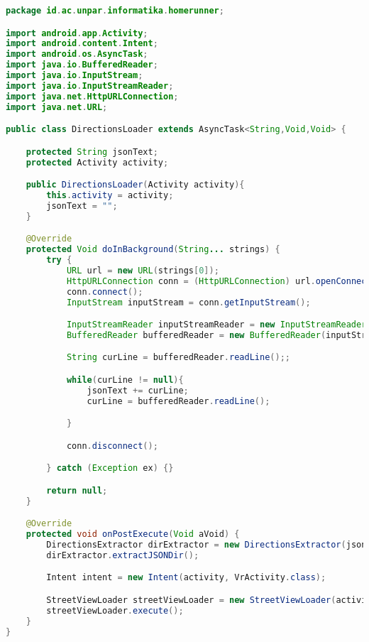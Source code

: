 \begin{lstlisting}[language=Java,caption=DirectionsLoader.java]
package id.ac.unpar.informatika.homerunner;

import android.app.Activity;
import android.content.Intent;
import android.os.AsyncTask;
import java.io.BufferedReader;
import java.io.InputStream;
import java.io.InputStreamReader;
import java.net.HttpURLConnection;
import java.net.URL;

public class DirectionsLoader extends AsyncTask<String,Void,Void> {

    protected String jsonText;
    protected Activity activity;

    public DirectionsLoader(Activity activity){
        this.activity = activity;
        jsonText = "";
    }

    @Override
    protected Void doInBackground(String... strings) {
        try {
            URL url = new URL(strings[0]);
            HttpURLConnection conn = (HttpURLConnection) url.openConnection();
            conn.connect();
            InputStream inputStream = conn.getInputStream();

            InputStreamReader inputStreamReader = new InputStreamReader(inputStream);
            BufferedReader bufferedReader = new BufferedReader(inputStreamReader);

            String curLine = bufferedReader.readLine();;

            while(curLine != null){
                jsonText += curLine;
                curLine = bufferedReader.readLine();

            }

            conn.disconnect();

        } catch (Exception ex) {}

        return null;
    }

    @Override
    protected void onPostExecute(Void aVoid) {
        DirectionsExtractor dirExtractor = new DirectionsExtractor(jsonText);
        dirExtractor.extractJSONDir();

        Intent intent = new Intent(activity, VrActivity.class);

        StreetViewLoader streetViewLoader = new StreetViewLoader(activity, intent, dirExtractor.arrSteps);
        streetViewLoader.execute();
    }
}
\end{lstlisting}

